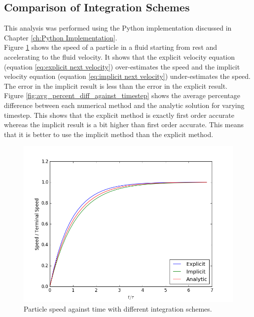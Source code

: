 \documentclass[10pt,a4paper,titlepage]{report}
\begin{document}
\subsection{Comparison of Integration Schemes}
\label{sec:integration scheme comparison}
This analysis was performed using the Python implementation discussed in Chapter \ref{ch:Python Implementation}.
\\Figure \ref{fig:terminal_velocity_implicit_explicit} shows the speed of a particle in a fluid starting from rest and accelerating to the fluid velocity. It shows that the explicit velocity equation (equation \ref{eq:explicit next velocity}) over-estimates the speed and the implicit velocity equation (equation \ref{eq:implicit next velocity}) under-estimates the speed. The error in the implicit result is less than the error in the explicit result.
\\Figure \ref{fig:avg_percent_diff_against_timestep} shows the average percentage difference between each numerical method and the analytic solution for varying timestep. This shows that the explicit method is exactly first order accurate whereas the implicit result is a bit higher than first order accurate. This means that it is better to use the implicit method than the explicit method.
\begin{figure}[!htb]
\centering
\includegraphics[scale=0.6]{figures/TerminalVelocityImplicitExplicit.png}
\caption{Particle speed against time with different integration schemes.}
\label{fig:terminal_velocity_implicit_explicit}
\end{figure}
\end{document}
